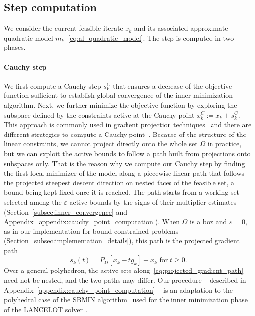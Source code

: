 \documentclass{article}
\numberwithin{equation}{section}
\newcommand{\proj}[2]{P_{#1} \left[ {#2} \right]} %
\theoremstyle{plain}
\begin{document}
	\subsection{Step computation}\label{subsec:step_computation}

	We consider the current feasible iterate $x_k$ and its associated approximate quadratic model $m_k$~\eqref{eq:al_quadratic_model}. The step is computed in two phases. 

\paragraph*{Cauchy step} We first compute a Cauchy step $s_k^C$ that ensures a decrease of the objective function sufficient to establish global convergence of the inner minimization algorithm. Next, we further minimize the objective function by exploring the subspace defined by the constraints active at the Cauchy point $x_k^C:=x_k+s_k^C$. This approach is commonly used in gradient projection techniques~\cite[Section~16.7]{nocedalwright:2006} and there are different strategies to compute a Cauchy point~\cite{conn-etal:1988b,moretoraldo:1991,linmore:1999a}. Because of the structure of the linear constraints, we cannot project directly onto the whole set $\Omega$ in practice, but we can exploit the active bounds to follow a path built from projections onto subspaces only. That is the reason why we compute our Cauchy step by finding the first local minimizer of the model along a piecewise linear path that follows the projected steepest descent direction on nested faces of the feasible set, a bound being kept fixed once it is reached. The path starts from a working set selected among the $\varepsilon$-active bounds by the signs of their multiplier estimates (Section~\ref{subsec:inner_convergence} and Appendix~\ref{appendix:cauchy_point_computation}). When $\Omega$ is a box and $\varepsilon = 0$, as in our implementation for bound-constrained problems (Section~\ref{subsec:implementation_details}), this path is the projected gradient path
\begin{equation}\label{eq:projected_gradient_path}
	s_k(t)=\proj{\Omega}{x_k-tg_k}-x_k \text{ for } t\ge 0.
\end{equation}
Over a general polyhedron, the active sets along~\eqref{eq:projected_gradient_path} need not be nested, and the two paths may differ.
Our procedure -- described in Appendix~\ref{appendix:cauchy_point_computation} -- is an adaptation to the polyhedral case of the SBMIN algorithm~\cite{conn-etal:1988b} used for the inner minimization phase of the LANCELOT solver~\cite{conn-etal:1992}.
\end{document}
